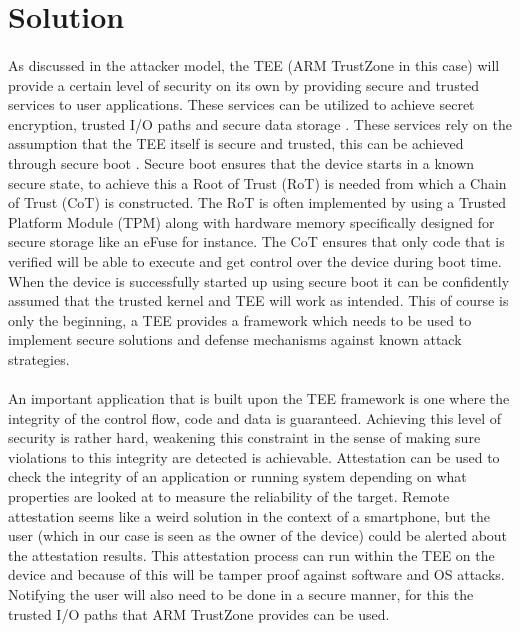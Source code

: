\section{Solution}

\paragraph*{}
As discussed in the attacker model, the TEE (ARM TrustZone in this case) will provide a certain level of security on its own by providing secure and trusted services to user applications. These services can be utilized to achieve secret encryption, trusted I/O paths and secure data storage \cite{PintoSandro2019DATA}. These services rely on the assumption that the TEE itself is secure and trusted, this can be achieved through secure boot \cite{JiangHang2017IaAS}. Secure boot ensures that the device starts in a known secure state, to achieve this a Root of Trust (RoT) is needed from which a Chain of Trust (CoT) is constructed. The RoT is often implemented by using a Trusted Platform Module (TPM) along with hardware memory specifically designed for secure storage like an eFuse for instance. The CoT ensures that only code that is verified will be able to execute and get control over the device during boot time. When the device is successfully started up using secure boot it can be confidently assumed that the trusted kernel and TEE will work as intended. This of course is only the beginning, a TEE provides a framework which needs to be used to implement secure solutions and defense mechanisms against known attack strategies. 

\paragraph*{}
An important application that is built upon the TEE framework is one where the integrity of the control flow, code and data is guaranteed. Achieving this level of security is rather hard, weakening this constraint in the sense of making sure violations to this integrity are detected is achievable. Attestation can be used to check the integrity of an application or running system depending on what properties are looked at to measure the reliability of the target. Remote attestation seems like a weird solution in the context of a smartphone, but the user (which in our case is seen as the owner of the device) could be alerted about the attestation results. This attestation process can run within the TEE on the device and because of this will be tamper proof against software and OS attacks. Notifying the user will also need to be done in a secure manner, for this the trusted I/O paths that ARM TrustZone provides can be used. 